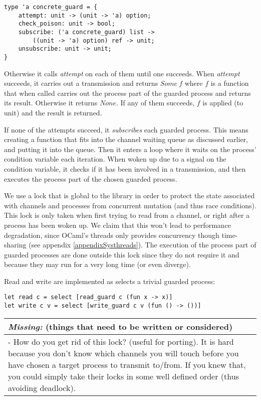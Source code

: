\documentclass[a4paper,12pt]{article}
\newcommand{\missing}[1]{
  \begin{tabular}{|p{11cm}|}
    \hline
    \emph{Missing:} {\scriptsize (things that need to be written or considered)} \\
    \hline
    #1
    \hline
  \end{tabular}
}
\begin{document}
\begin{verbatim}
type 'a concrete_guard = {
    attempt: unit -> (unit -> 'a) option;
    check_poison: unit -> bool;
    subscribe: ('a concrete_guard) list -> 
        ((unit -> 'a) option) ref -> unit;
    unsubscribe: unit -> unit;
}
\end{verbatim}

Otherwise it calls \emph{attempt} on each of them until one succeeds.
When \emph{attempt} succeeds, it carries out a transmission and returns $Some\
f$ where $f$ is a function that when called carries out the process part of the
guarded process and returns its result. Otherwise it returns $None$. If any of
them succeeds, $f$ is applied (to unit) and the result is returned.

If none of the attempts succeed, it \emph{subscribes} each guarded process.
This means creating a function that fits into the channel waiting queue
as discussed earlier, and putting it into the queue. Then it enters a loop
where it waits on the process' condition variable each iteration. When woken up
due to a signal on the condition variable, it checks if it has been involved in
a transmission, and then executes the process part of the chosen guarded
process.

We use a lock that is global to the library in order to protect the state
associated with channels and processes from concurrent mutation (and
thus race conditions). This lock is only taken when first trying to read from a
channel, or right after a process has been woken up. We claim that this won't
lead to performance degradation, since OCaml's threads only provides concurrency
though time-sharing (see appendix \ref{appendixSysthreads}). The execution of
the process part of guarded processes are done outside this lock since they do
not require it and because they may run for a very long time (or even diverge).

Read and write are implemented as selects a trivial guarded process:
\begin{verbatim}
let read c = select [read_guard c (fun x -> x)]
let write c v = select [write_guard c v (fun () -> ())]
\end{verbatim}

\missing{
- How do you get rid of this lock? (useful for porting). It is hard because you don't know which
channels you will touch before you have chosen a target process to transmit to/from. If you knew
that, you could simply take their locks in some well defined order (thus avoiding deadlock). \\
}
\end{document}
